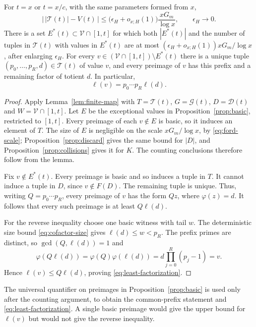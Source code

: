 \begin{proposition}\label{prop:unique-prefix}
For $t=x$ or $t=x/c$, with the same parameters formed from $x$,
\begin{equation}\label{eq:tuple-cardinality}
 \bigl|\,|\mathcal T(t)|-V(t)\,\bigr|
       \le\bigl(\epsilon_H+o_{x;H}(1)\bigr)\frac{xG_m}{\log x},
 \qquad\epsilon_H\longrightarrow0.
\end{equation}
There is a set $E^*(t)\subset\mathcal V\cap[1,t]$ for which both
$|E^*(t)|$ and the number of tuples in $\mathcal T(t)$ with values in
$E^*(t)$ are at most
$(\epsilon_H+o_{x;H}(1))xG_m/\log x$, after enlarging $\epsilon_H$.
For every $v\in(\mathcal V\cap[1,t])\setminus E^*(t)$ there is a unique tuple
$(p_0,\ldots,p_R,d)\in\mathcal T(t)$ of value $v$, and every preimage
of $v$ has this prefix and a remaining factor of totient $d$.
In particular,
\begin{equation}\label{eq:least-factorization}
 \ell(v)=p_0\cdots p_R\ell(d).
\end{equation}
\end{proposition}

\begin{proof}
Apply Lemma~\ref{lem:finite-map} with $T=\mathcal T(t)$,
$G=\mathcal G(t)$, $D=\mathcal D(t)$ and
$W=\mathcal V\cap[1,t]$.  Let $E$ be the exceptional values in
Proposition~\ref{prop:basic}, restricted to $[1,t]$.  Every preimage
of each $v\notin E$ is basic, so it induces an element of $T$.
The size of $E$ is negligible on the scale $xG_m/\log x$, by
\eqref{eq:ford-scale}; Proposition~\ref{prop:discard} gives the same
bound for $|D|$, and Proposition~\ref{prop:collisions} gives it for
$K$.  The counting conclusions therefore follow from the lemma.

Fix $v\notin E^*(t)$.  Every preimage is basic and so induces a tuple
in $T$.  It cannot induce a tuple in $D$, since $v\notin F(D)$.
The remaining tuple is unique.  Thus, writing $Q=p_0\cdots p_R$,
every preimage of $v$ has the form $Qz$, where $\varphi(z)=d$.
It follows that every such preimage is at least $Q\ell(d)$.

For the reverse inequality choose one basic witness with tail $w$.
The deterministic size bound \eqref{eq:cofactor-size} gives
$\ell(d)\le w<p_R$.  The prefix primes are distinct, so
$\gcd(Q,\ell(d))=1$ and
\[
 \varphi(Q\ell(d))=\varphi(Q)\varphi(\ell(d))
                 =d\prod_{j=0}^R(p_j-1)=v.
\]
Hence $\ell(v)\le Q\ell(d)$, proving \eqref{eq:least-factorization}.
\end{proof}

The universal quantifier on preimages in Proposition~\ref{prop:basic}
is used only after the counting argument, to obtain the common-prefix
statement and \eqref{eq:least-factorization}.  A single basic preimage
would give the upper bound for $\ell(v)$ but would not give the reverse
inequality.

